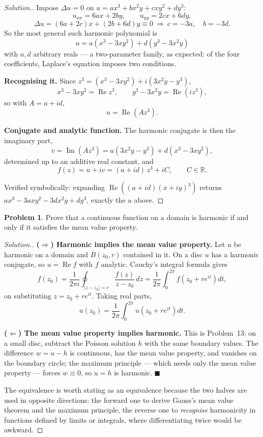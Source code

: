 \documentclass[11pt,a4paper]{article}
\theoremstyle{definition}
\newtheorem{problemx}{Problem}[section]
\newenvironment{problem}{\begin{problemx}}{\end{problemx}}
\newenvironment{solution}
  {\renewcommand{\qedsymbol}{}\begin{proof}[\textit{Solution}.]}
  {\end{proof}}
\begin{document}
\begin{solution}
Impose $\Delta u = 0$ on $u = ax^{3}+bx^{2}y+cxy^{2}+dy^{3}$:
$$u_{xx} = 6ax + 2by,\qquad u_{yy} = 2cx + 6dy,$$
$$\Delta u = (6a+2c)x + (2b+6d)y \equiv 0
\ \Longrightarrow\ c = -3a,\quad b = -3d .$$
So the most general such harmonic polynomial is
$$\boxed{u = a\left(x^{3}-3xy^{2}\right) + d\left(y^{3}-3x^{2}y\right)}$$
with $a, d$ arbitrary reals --- a two-parameter family, as expected: of the four
coefficients, Laplace's equation imposes two conditions.

\textbf{Recognising it.} Since $z^{3} = (x^{3}-3xy^{2}) + i(3x^{2}y - y^{3})$,
$$x^{3}-3xy^{2} = \operatorname{Re}z^{3},
\qquad y^{3}-3x^{2}y = \operatorname{Re}\!\left(iz^{3}\right),$$
so with $A = a + id$,
$$u = \operatorname{Re}\!\left(A z^{3}\right).$$

\textbf{Conjugate and analytic function.} The harmonic conjugate is then the
imaginary part,
$$v = \operatorname{Im}\!\left(Az^{3}\right)
= a\left(3x^{2}y - y^{3}\right) + d\left(x^{3}-3xy^{2}\right),$$
determined up to an additive real constant, and
$$f(z) = u + iv = (a+id)\,z^{3} + iC, \qquad C \in \mathbb{R}.$$

Verified symbolically: expanding $\operatorname{Re}\!\left((a+id)(x+iy)^{3}\right)$
returns $ax^{3} - 3ax y^{2} - 3d x^{2}y + dy^{3}$, exactly the $u$ above.
\end{solution}


\begin{problem}
Prove that a continuous function on a domain is harmonic if and only if it
satisfies the mean value property.
\end{problem}

\begin{solution}
\textbf{($\Rightarrow$) Harmonic implies the mean value property.} Let $u$ be
harmonic on a domain and $\overline{B}(z_0,r)$ contained in it. On a disc $u$ has a
harmonic conjugate, so $u = \operatorname{Re}f$ with $f$ analytic. Cauchy's
integral formula gives
$$f(z_0) = \frac{1}{2\pi i}\oint_{\left|z-z_0\right|=r}\frac{f(z)}{z-z_0}\,dz
= \frac{1}{2\pi}\int^{2\pi}_{0} f\!\left(z_0+re^{it}\right)dt,$$
on substituting $z = z_0 + re^{it}$. Taking real parts,
$$u(z_0) = \frac{1}{2\pi}\int^{2\pi}_{0} u\!\left(z_0+re^{it}\right)dt .$$

\textbf{($\Leftarrow$) The mean value property implies harmonic.} This is
Problem~13: on a small disc, subtract the Poisson solution $h$ with the same
boundary values. The difference $w = u - h$ is continuous, has the mean value
property, and vanishes on the boundary circle; the maximum principle --- which needs
only the mean value property --- forces $w \equiv 0$, so $u = h$ is harmonic.
$\blacksquare$

The equivalence is worth stating as an equivalence because the two halves are used
in opposite directions: the forward one to derive Gauss's mean value theorem and
the maximum principle, the reverse one to \emph{recognise} harmonicity in functions
defined by limits or integrals, where differentiating twice would be awkward.
\end{solution}
\end{document}
